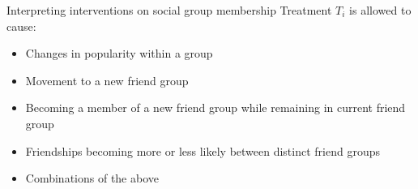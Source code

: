 \documentclass[aspectratio=169]{beamer}
\theoremstyle{remark}
\begin{document}
\begin{frame}{Interpreting interventions on social group membership}
    Treatment $T_i$ is allowed to cause:
    \begin{itemize}
        \item Changes in popularity within a group
        \item Movement to a new friend group
        \item Becoming a member of a new friend group while remaining in current friend group
        \item Friendships becoming more or less likely between distinct friend groups
        \item Combinations of the above
    \end{itemize}
\end{frame}



\end{document}
